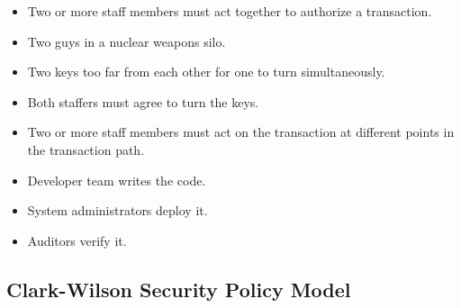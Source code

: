 \begin{frame}
  \begin{example}
    \begin{itemize}
      \item Two or more staff members must act together to authorize 
        a transaction.
    \end{itemize}
  \end{example}

  \pause{}

  \begin{example}
    \begin{itemize}
      \item Two guys in a nuclear weapons silo.
      \item Two keys too far from each other for one to turn simultaneously.
      \item Both staffers must agree to turn the keys.
    \end{itemize}
  \end{example}
\end{frame}

\begin{frame}
  \begin{example}
    \begin{itemize}
      \item Two or more staff members must act on the transaction at different 
        points in the transaction path.
    \end{itemize}
  \end{example}
  
  \pause{}

  \begin{example}
    \begin{itemize}
      \item Developer team writes the code.
      \item System administrators deploy it.
      \item Auditors verify it.
    \end{itemize}
  \end{example}
\end{frame}

\subsection{Clark-Wilson Security Policy Model}

